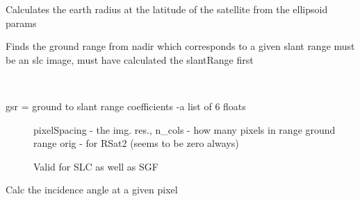 \documentclass[letterpaper,10pt,openany,oneside]{sphinxmanual}
\begin{document}

\begin{fulllineitems}
\label{code:Metadata.getEarthRadius}
Calculates the earth radius at the latitude of the satellite from the ellipsoid params

\end{fulllineitems}


\begin{fulllineitems}
\label{code:Metadata.getGroundRange}
Finds the ground range from nadir which corresponds to a given slant range
must be an slc image, must have calculated the slantRange first

\end{fulllineitems}


\begin{fulllineitems}
\label{code:Metadata.getSlantRange}~\begin{description}
\item[{gsr = ground to slant range coefficients -a list of 6 floats}] \leavevmode
pixelSpacing - the img. res., n\_cols - how many pixels in range
ground range orig - for RSat2 (seems to be zero always)

Valid for SLC as well as SGF

\end{description}

\end{fulllineitems}


\begin{fulllineitems}
\label{code:Metadata.getThetaPixel}
Calc the incidence angle at a given pixel

\end{fulllineitems}

\end{document}
